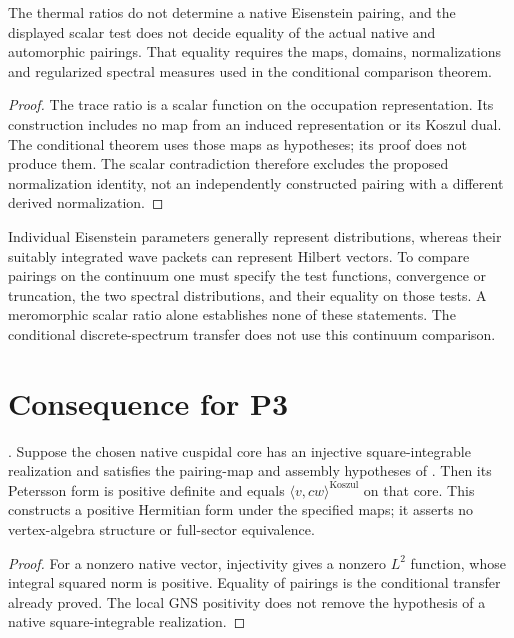 \begin{corollary}
\label{v4-arith:kms-gns:cor:eisenstein-final}
The thermal ratios do not determine a native Eisenstein pairing, and
the displayed scalar test does not decide equality of the actual native
and automorphic pairings. That equality requires the maps, domains,
normalizations and regularized spectral measures used in the
conditional comparison theorem.
\end{corollary}
\begin{proof}
The trace ratio is a scalar function on the occupation representation.
Its construction includes no map from an induced representation or its
Koszul dual. The conditional theorem uses those maps as hypotheses;
its proof does not produce them. The scalar contradiction therefore
excludes the proposed normalization identity, not an independently
constructed pairing with a different derived normalization.
\end{proof}

\begin{remark}
\label{v4-arith:kms-gns:rem:continuum-honest-domain}
Individual Eisenstein parameters generally represent distributions,
whereas their suitably integrated wave packets can represent Hilbert
vectors. To compare pairings on the continuum one must specify the test
functions, convergence or truncation, the two spectral distributions,
and their equality on those tests. A meromorphic scalar ratio alone
establishes none of these statements. The conditional discrete-spectrum
transfer does not use this continuum comparison.
\end{remark}

\section{Consequence for P3}
\label{v4-arith:kms-gns:P3}

\begin{theorem}
\label{v4-arith:kms-gns:thm:P3-tempered-cuspidal}
\ClaimStatusProvedHereConditional. Suppose the chosen native
cuspidal core has an injective square-integrable realization and
satisfies the pairing-map and assembly hypotheses of
.
Then its Petersson form is positive definite and equals
$\langle v,cw\rangle^{\mathrm{Koszul}}$ on that core. This
constructs a positive Hermitian form under the specified maps;
it asserts no vertex-algebra structure or full-sector equivalence.
\end{theorem}
\begin{proof}
For a nonzero native vector, injectivity gives a nonzero $L^2$
function, whose integral squared norm is positive. Equality of
pairings is the conditional transfer already proved. The local
GNS positivity does not remove the hypothesis of a native
square-integrable realization.
\end{proof}

